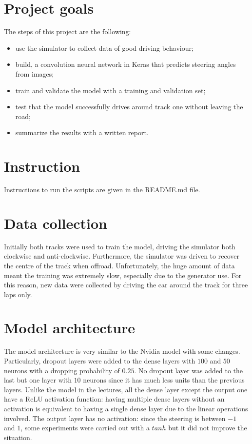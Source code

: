 \documentclass{article}
\begin{document}
\section{Project goals}
The steps of this project are the following:
\begin{itemize}
\item use the simulator to collect data of good driving behaviour;
\item build, a convolution neural network in Keras that predicts steering angles from images;
\item train and validate the model with a training and validation set;
\item test that the model successfully drives around track one without leaving the road;
\item summarize the results with a written report.
\end{itemize}

\section{Instruction}
Instructions to run the scripts are given in the README.md file.

\section{Data collection}
Initially both tracks were used to train the model, driving the simulator both clockwise and anti-clockwise. Furthermore, the simulator was driven to recover the centre of the track when offroad. Unfortunately, the huge amount of data meant the training was extremely slow, especially due to the generator use. For this reason, new data were collected by driving the car around the track for three laps only.

\section{Model architecture}
The model architecture is very similar to the Nvidia model with some changes. Particularly, dropout layers  were added to the dense layers with $100$ and $50$ neurons with a dropping probability of $0.25$. No dropout layer was added to the last but one layer with $10$ neurons since it has much less units than the previous layers. Unlike the model in the lectures, all the dense layer except the output one have a ReLU activation function: having multiple dense layers without an activation is equivalent to having a single dense layer due to the linear operations involved. The output layer has no activation: since the steering is between $-1$ and $1$, some experiments were carried out with a $tanh$ but it did not improve the situation.
\end{document}
